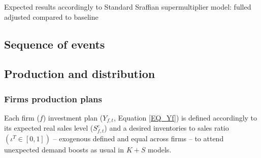 \documentclass{SelfArx}
\begin{document}
\begin{table*}\centering
\caption{Expected results accordingly to Standard Sraffian supermultiplier model: fulled adjusted compared to baseline}
\label{Tab_exp_resul_long:ch_super}
\caption*{\textbf{Source:} Authors' elaboration}
\end{table*}

\subsection{Sequence of events}
\label{sec:org5af80f9}



\subsection{Production and distribution}
\label{sec:org4a78229}


\subsubsection{Firms production plans}
\label{sec:orgeb30996}

Each firm (\(f\)) investment plan (\(Y_{f,t}\), Equation \ref{EQ_Yf}) is defined accordingly to its expected real sales level (\(S^{e}_{f,t}\)) and a desired inventories to sales ratio \((\iota^{T} \in [0,1])\) -- exogenous defined and equal across firms -- to attend unexpected demand boosts as usual in \(K+S\) models.
\end{document}
